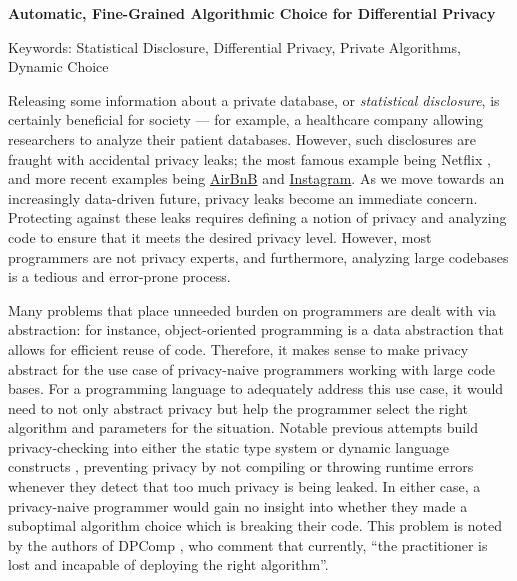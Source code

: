 \documentclass[10.5pt]{article}
\begin{document}
\centerline{\textbf{Automatic, Fine-Grained Algorithmic Choice for Differential Privacy}}
\centerline{Keywords: Statistical Disclosure, Differential Privacy, Private Algorithms, Dynamic Choice}
Releasing some information about a private database, or \emph{statistical disclosure}, is certainly beneficial for society --- for example, a  healthcare company allowing researchers to analyze their patient databases. However, such disclosures are fraught with accidental privacy leaks; the most famous example being Netflix \cite{Narayanan:2006}, and more recent examples being \href{https://hackernoon.com/how-to-rob-an-airbnb-252e7e7eda44}{AirBnB} and \href{https://gizmodo.com/this-is-almost-certainly-james-comey-s-twitter-account-1793843641}{Instagram}. As we move towards an increasingly data-driven future, privacy leaks become an immediate concern. Protecting against these leaks requires defining a notion of privacy and analyzing code to ensure that it meets the desired privacy level. However, most programmers are not privacy experts, and furthermore, analyzing large codebases is a tedious and error-prone process.

Many problems that place unneeded burden on programmers are dealt with via abstraction: for instance, object-oriented programming is a data abstraction that allows for efficient reuse of code. Therefore, it makes sense to make privacy abstract for the use case of privacy-naive programmers working with large code bases. For a programming language to adequately address this use case, it would need to not only abstract privacy but help the programmer select the right algorithm and parameters for the situation. Notable previous attempts build privacy-checking into either the static type system \cite{Reed:2010} or dynamic language constructs \cite{McSherry:2010}, preventing privacy by not compiling  or throwing runtime errors whenever they detect that too much privacy is being leaked. In either case, a privacy-naive programmer would gain no insight into whether they made a suboptimal algorithm choice which is breaking their code. This problem is noted by the authors of DPComp \cite{Hay:2016}, who comment that currently, ``the practitioner is lost and incapable of deploying the right algorithm''.
\end{document}
